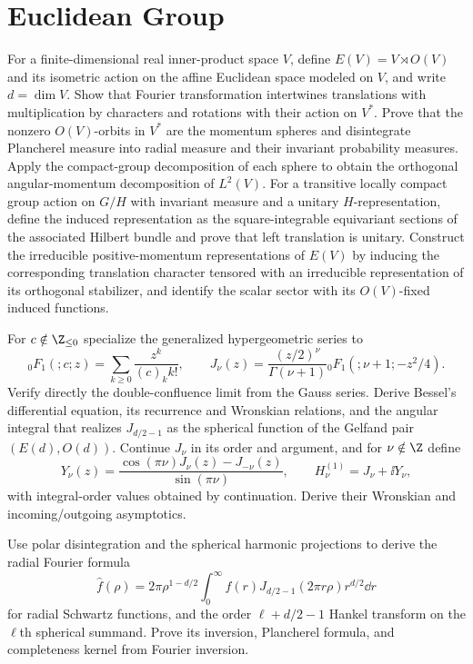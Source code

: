 \section{Euclidean Group}

\begin{exercise}
For a finite-dimensional real inner-product space $V$, define
$E(V)=V\rtimes O(V)$ and its isometric action on the affine Euclidean space
modeled on $V$, and write $d=\dim V$.  Show that Fourier transformation intertwines translations
with multiplication by characters and rotations with their action on $V^*$.
Prove that the nonzero $O(V)$-orbits in $V^*$ are the momentum spheres and
disintegrate Plancherel measure into radial measure and their invariant
probability measures.  Apply the compact-group decomposition of each sphere
to obtain the orthogonal angular-momentum decomposition of $L^2(V)$.
For a transitive locally compact group action on $G/H$ with invariant measure
and a unitary $H$-representation, define the induced representation as the
square-integrable equivariant sections of the associated Hilbert bundle and
prove that left translation is unitary.
Construct the irreducible positive-momentum representations of $E(V)$ by
inducing the corresponding translation character tensored with an
irreducible representation of its orthogonal stabilizer, and identify the
scalar sector with its $O(V)$-fixed induced functions.
\end{exercise}

\begin{exercise}
For $c\notin\Z_{\leq0}$ specialize the generalized hypergeometric series to
\[
 {}_0F_1(;c;z)=\sum_{k\geq0}\frac{z^k}{(c)_k k!},
 \qquad
 J_\nu(z)=\frac{(z/2)^\nu}{\Gamma(\nu+1)}
 {}_0F_1(;\nu+1;-z^2/4).
\]
Verify directly the double-confluence limit from the Gauss series.
Derive Bessel's differential equation, its recurrence and Wronskian
relations, and the angular integral that realizes $J_{d/2-1}$ as the
spherical function of the Gelfand pair $(E(d),O(d))$.  Continue $J_\nu$ in
its order and argument, and for $\nu\notin\Z$ define
\[
 Y_\nu(z)=\frac{\cos(\pi\nu)J_\nu(z)-J_{-\nu}(z)}{\sin(\pi\nu)},
 \qquad H_\nu^{(1)}=J_\nu+\ii Y_\nu,
\]
with integral-order values obtained by continuation.  Derive their Wronskian
and incoming/outgoing asymptotics.

Use polar disintegration and the spherical harmonic projections to derive
the radial Fourier formula
\[
 \widehat f(\rho)=2\pi\rho^{1-d/2}
 \int_0^\infty f(r)J_{d/2-1}(2\pi r\rho)r^{d/2}\dd r
\]
for radial Schwartz functions, and the order
$\ell+d/2-1$ Hankel transform on the $\ell$th spherical summand.  Prove its
inversion, Plancherel formula, and completeness kernel from Fourier inversion.
\end{exercise}

